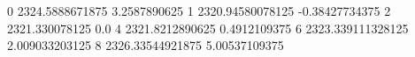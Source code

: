 0 2324.5888671875 3.2587890625
1 2320.94580078125 -0.38427734375
2 2321.330078125 0.0
4 2321.8212890625 0.4912109375
6 2323.339111328125 2.009033203125
8 2326.33544921875 5.00537109375
